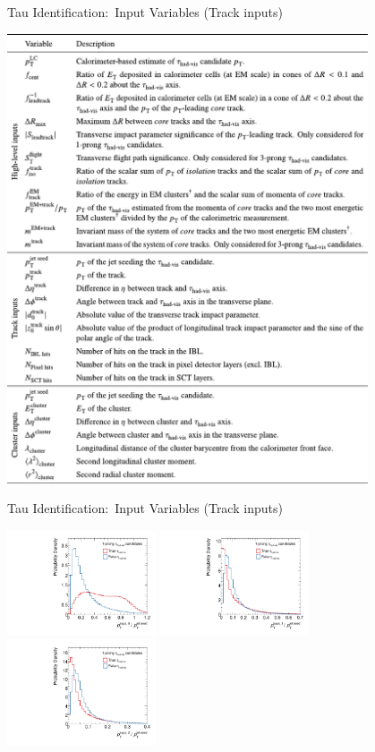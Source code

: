 \documentclass[11pt, xcolor={dvipsnames}, aspectratio=169]{beamer}
\begin{document}

\begin{frame}{Tau Identification:\ Input Variables (Track inputs)}
  \centering

  \includegraphics[width=0.8\textwidth, trim=0 1.55in 0 3.5in,
  clip]{backup/tauid_variable_table}
\end{frame}


\begin{frame}{Tau Identification:\ Input Variables (Track inputs)}
  \centering

  \includegraphics[width=0.33\textwidth]{tauid/invars/invars_trk0relpt_1P}%
  \includegraphics[width=0.33\textwidth]{tauid/invars/invars_trk1relpt_1P}%
  \includegraphics[width=0.33\textwidth]{tauid/invars/invars_trk2relpt_1P}
\end{frame}
\end{document}

